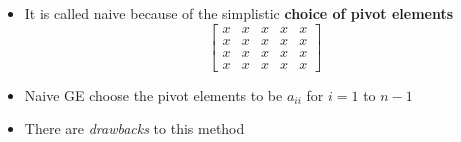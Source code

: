 \documentclass[10pt]{beamer}
\begin{document}
\begin{frame}{}

\vfill

\begin{itemize}
    \item  It is called naive because of the simplistic \textbf{choice of pivot elements }
    \[
    \begin{bmatrix}
        \boxed{x} & x & x & x  & x \\
        x & \boxed{x} & x & x &  x \\
        x & x & \boxed{x} & x &  x \\
        x & x & x & x &  x
    \end{bmatrix}
    \]
    \item Naive GE choose the pivot elements to be $a_{ii}$ for $i = 1$ to $n-1$
    \vfill 
    \item There are \textit{drawbacks} to this method
    \vfill 
\end{itemize}

    

\end{frame}

\end{document}
